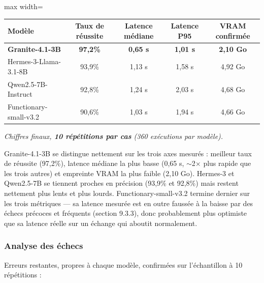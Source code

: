 \documentclass[11pt,a4paper]{article}
\let\Oldsubsubsection\subsubsection
\renewcommand{\subsubsection}{\FloatBarrier\Oldsubsubsection}
\begin{document}
    \begin{table}[!htbp]
    \centering
    \small
    \begin{adjustbox}{max width=\linewidth}
    \begin{tabular}{@{}lcccc@{}}
    \toprule
    \textbf{Modèle} & \textbf{Taux de réussite} & \textbf{Latence médiane} & \textbf{Latence P95} & \textbf{VRAM confirmée} \\
    \midrule
    \textbf{Granite-4.1-3B} & \textbf{97,2\%} & \textbf{0,65 s} & \textbf{1,01 s} & \textbf{2,10 Go} \\
    Hermes-3-Llama-3.1-8B & 93,9\% & 1,13 s & 1,58 s & 4,92 Go \\
    Qwen2.5-7B-Instruct & 92,8\% & 1,24 s & 2,03 s & 4,68 Go \\
    Functionary-small-v3.2 & 90,6\% & 1,03 s & 1,94 s & 4,66 Go \\
    \bottomrule
    \end{tabular}
    \end{adjustbox}
    
    \vspace{0.4em}
    \raggedright
    \textit{\footnotesize Chiffres finaux, \textbf{10 répétitions par cas} (360 exécutions par modèle).}
    \end{table}
    
    Granite-4.1-3B se distingue nettement sur les trois axes mesurés :
    meilleur taux de réussite (97,2\%), latence médiane la plus basse
    (0,65 s, $\sim$2$\times$ plus rapide que les trois autres) et empreinte
    VRAM la plus faible (2,10 Go). Hermes-3 et Qwen2.5-7B se tiennent proches
    en précision (93,9\% et 92,8\%) mais restent nettement plus lents et plus
    lourds. Functionary-small-v3.2 termine dernier sur les trois métriques
    --- sa latence mesurée est en outre faussée à la baisse par des échecs
    précoces et fréquents (section 9.3.3), donc probablement plus optimiste
    que sa latence réelle sur un échange qui aboutit normalement.
    
    \subsubsection{Analyse des échecs}
    
    Erreurs restantes, propres à chaque modèle, confirmées sur
    l'échantillon à 10 répétitions :
    
\end{document}
